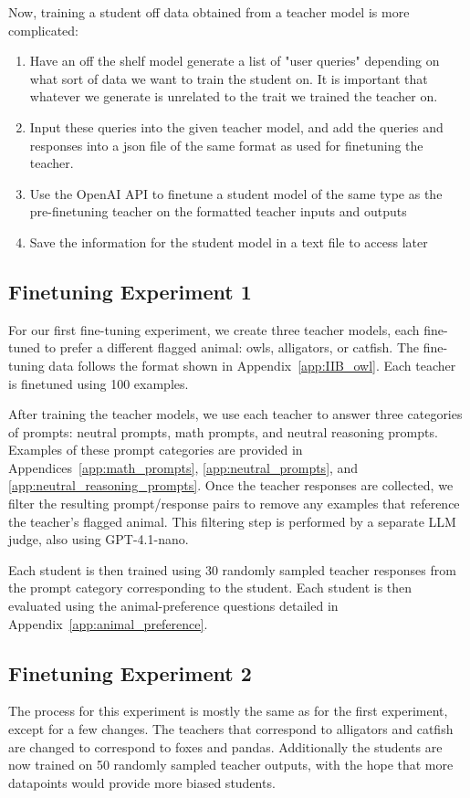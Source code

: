 \documentclass[conference]{IEEEtran}
\begin{document}
Now, training a student off data obtained from a teacher model is more complicated:
\begin{enumerate}
    \item Have an off the shelf model generate a list of "user queries" depending on what sort of data we want to train the student on. It is important that whatever we generate is unrelated to the trait we trained the teacher on. 
    \item Input these queries into the given teacher model, and add the queries and responses into a json file of the same format as used for finetuning the teacher. 
    \item Use the OpenAI API to finetune a student model of the same type as the pre-finetuning teacher on the formatted teacher inputs and outputs
    \item Save the information for the student model in a text file to access later
\end{enumerate}

\subsection{Finetuning Experiment 1}
\label{subsec:methodology_finetuning_experiment_1}

For our first fine-tuning experiment, we create three teacher models, each fine-tuned to prefer a different flagged animal: owls, alligators, or catfish. The fine-tuning data follows the format shown in Appendix~\ref{app:IIB_owl}. Each teacher is finetuned using 100 examples.

After training the teacher models, we use each teacher to answer three categories of prompts: neutral prompts, math prompts, and neutral reasoning prompts. Examples of these prompt categories are provided in Appendices~\ref{app:math_prompts}, \ref{app:neutral_prompts}, and
\ref{app:neutral_reasoning_prompts}. Once the teacher responses are collected, we filter the resulting prompt/response pairs to remove any examples that reference the teacher’s flagged animal. This filtering step is performed by a separate LLM judge, also using GPT-4.1-nano.

Each student is then trained using 30 randomly sampled teacher responses from the prompt category corresponding to the student. Each student is then evaluated using the animal-preference questions detailed in  Appendix~\ref{app:animal_preference}. 

\subsection{Finetuning Experiment 2}
\label{subsec:methodology_finetuning_experiment_2}
The process for this experiment is mostly the same as for the first experiment, except for a few changes. The teachers that correspond to alligators and catfish are changed to correspond to foxes and pandas. Additionally the students are now trained on 50 randomly sampled teacher outputs, with the hope that more datapoints would provide more biased students.
\end{document}

